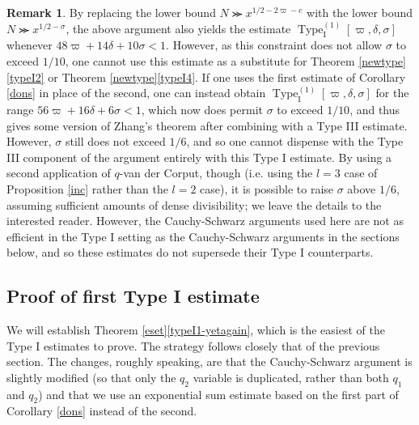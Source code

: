 \documentclass[12pt,a4paper,reqno]{amsart}
\numberwithin{equation}{section}
\theoremstyle{plain}
\theoremstyle{definition}
\newtheorem{remark}[theorem]{Remark}
\newcommand\TypeI{\operatorname{Type}_{\operatorname{I}}}
\renewcommand{\gtrapprox}{\ggcurly}
\begin{document}

\begin{remark} By replacing the lower bound $N \gtrapprox
  x^{1/2-2\varpi-c}$ with the lower bound $N \gtrapprox
  x^{1/2-\sigma}$, the above argument also yields the estimate
  $\TypeI^{(1)}[\varpi,\delta,\sigma]$ whenever
  $48\varpi+14\delta+10\sigma < 1$.  However, as this constraint does
  not allow $\sigma$ to exceed $1/10$, one cannot use this estimate as
  a substitute for Theorem \ref{newtype}\eqref{typeI2} or Theorem
  \ref{newtype}\eqref{typeI4}.  If one uses the first estimate of
  Corollary \ref{dons} in place of the second, one can instead obtain
  $\TypeI^{(1)}[\varpi,\delta,\sigma]$ for the range $56 \varpi+16\delta+6\sigma< 1$, which
  now does permit $\sigma$ to exceed $1/10$, and thus gives some
  version of Zhang's theorem after combining with a Type III estimate.
  However, $\sigma$ still does not exceed $1/6$, and so one cannot
  dispense with the Type III component of the argument entirely with
  this Type I estimate.  By using a second application of $q$-van der
  Corput, though (i.e. using the $l=3$ case of Proposition \ref{inc}
  rather than the $l=2$ case), it is possible to raise $\sigma$ above
  $1/6$, assuming sufficient amounts of dense divisibility; we leave
  the details to the interested reader.  However, the Cauchy-Schwarz
  arguments used here are not as efficient in the Type I setting as
  the Cauchy-Schwarz arguments in the sections below, and so these
  estimates do not supersede their Type I counterparts.
\end{remark}

\subsection{Proof of first Type I estimate}\label{typei-1-sec}

We will establish Theorem \ref{eset}\eqref{typeI1-yetagain}, which is
the easiest of the Type I estimates to prove. The strategy follows
closely that of the previous section. The changes, roughly speaking,
are that the Cauchy-Schwarz argument is slightly modified (so that
only the $q_2$ variable is duplicated, rather than both $q_1$ and
$q_2$) and that we use an exponential sum estimate based on the first
part of Corollary \ref{dons} instead of the second.
\end{document}
